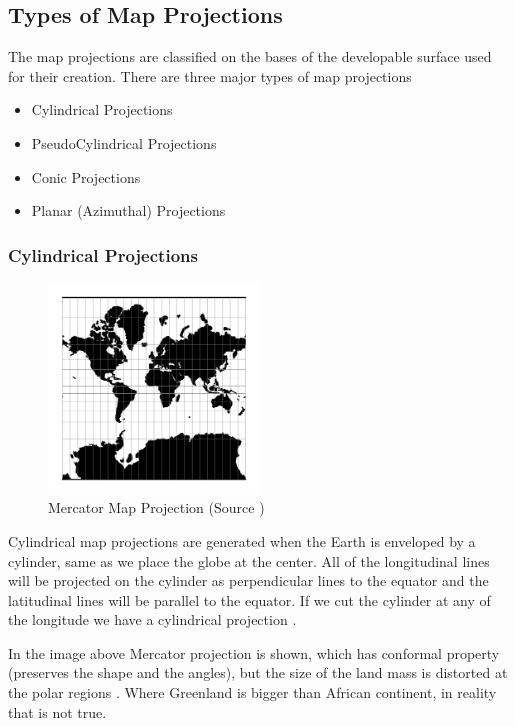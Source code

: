 \subsection{Types of Map Projections}

The map projections are classified on the bases of the developable surface used for their creation. There are three major types of map projections

\begin{itemize}
    \item Cylindrical Projections
    \item PseudoCylindrical Projections
    \item Conic Projections
    \item Planar (Azimuthal) Projections
\end{itemize}

\subsubsection{Cylindrical Projections}
\begin{figure}[h]
    \centering
    \includegraphics[width=0.5\textwidth]{figures/chapter-3/merc.png}
    \caption{Mercator Map Projection (Source \cite{PROJ_SITE})}
    \label{fig:merc}
\end{figure}

Cylindrical map projections are generated when the Earth is enveloped by a cylinder, same as we place the globe at the center. All of the longitudinal lines will be projected on the cylinder as perpendicular lines to the equator and the latitudinal lines  will be parallel to the equator. If we cut the cylinder at any of the longitude we have a cylindrical projection \cite{Snyder1982}.

In the image above Mercator projection is shown, which has conformal property (preserves the shape and the angles), but the size of the land mass is distorted at the polar regions \cite{GISGEO_Cylinder}. Where Greenland is bigger than African continent, in reality that is not true.


